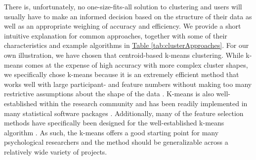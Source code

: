\documentclass[man, 12pt, a4paper, mask, floatsintext]{apa7}
\theoremstyle{break}
\theoremstyle{plain}
\newcommand{\tblref}[2][]{\hyperref[#2]{Table \ref*{#2}#1}}
\begin{document}
There is, unfortunately, no one-size-fits-all solution to clustering and users will usually have to make an informed decision based on the structure of their data as well as an appropriate weighing of accuracy and efficiency. We provide a short intuitive explanation for common approaches, together with some of their characteristics and example algorithms in \tblref{tab:clusterApproaches}. For our own illustration, we have chosen that centroid-based k-means clustering. While k-means comes at the expense of high accuracy with more complex cluster shapes, we specifically chose k-means because it is an extremely efficient method that works well with large participant- and feature numbers without making too many restrictive assumptions about the shape of the data \citep{jain2010}. K-means is also well-established within the research community and has been readily implemented in many statistical software packages \citep{hand2005}. Additionally, many of the feature selection methods have specifically been designed for the well-established k-means algorithm \citep[e.g.,][]{boutsidis2010}. As such, the k-means offers a good starting point for many psychological researchers and the method should be generalizable across a relatively wide variety of projects.

\end{document}
